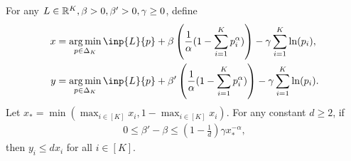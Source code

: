\begin{lemma}
    For any $L \in \mathbb{R}^K, \beta > 0, \beta' > 0, \gamma \geq 0$, define 
    \begin{align*}
        x &= \argmin_{p \in \Delta_K}\inp{L}{p} + \beta\left(\frac{1}{\alpha}(1-\sum_{i=1}^K p_i^\alpha)\right) - \gamma\sum_{i=1}^K \ln(p_i), \\
        y &= \argmin_{p \in \Delta_K}\inp{L}{p} + \beta'\left(\frac{1}{\alpha}(1-\sum_{i=1}^K p_i^\alpha)\right) - \gamma\sum_{i=1}^K \ln(p_i).
    \end{align*}
    Let $x_* = \min(\max_{i \in [K]}x_i, 1 - \max_{i \in [K]}x_i)$.
    For any constant $d \geq 2$, if 
    \begin{align}
        0 \leq \beta' - \beta \leq \left(1- \frac{1}{d}\right)\gamma x_*^{-\alpha},
    \end{align} 
    then $y_i \leq dx_i$ for all $i \in [K]$.
    \label{lemma:stableSameLossDiffBeta}
\end{lemma}
